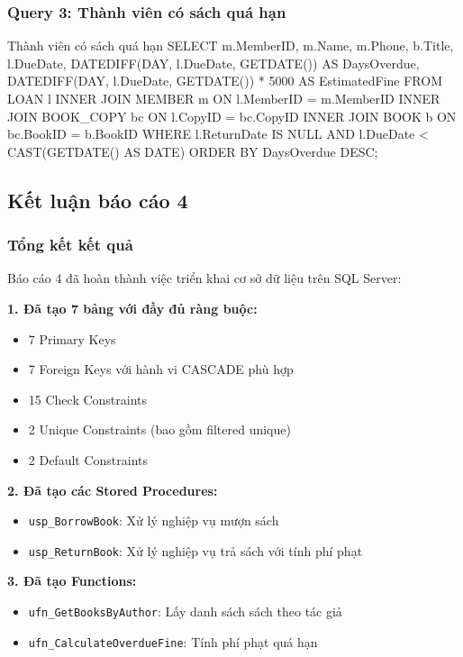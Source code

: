 \documentclass[12pt,a4paper]{article}
\begin{document}
\subsubsection{Query 3: Thành viên có sách quá hạn}

\begin{sqlcode}{Thành viên có sách quá hạn}
SELECT
    m.MemberID,
    m.Name,
    m.Phone,
    b.Title,
    l.DueDate,
    DATEDIFF(DAY, l.DueDate, GETDATE()) AS DaysOverdue,
    DATEDIFF(DAY, l.DueDate, GETDATE()) * 5000 AS EstimatedFine
FROM LOAN l
INNER JOIN MEMBER m ON l.MemberID = m.MemberID
INNER JOIN BOOK_COPY bc ON l.CopyID = bc.CopyID
INNER JOIN BOOK b ON bc.BookID = b.BookID
WHERE l.ReturnDate IS NULL
  AND l.DueDate < CAST(GETDATE() AS DATE)
ORDER BY DaysOverdue DESC;
\end{sqlcode}

\subsection{Kết luận báo cáo 4}

\subsubsection{Tổng kết kết quả}

Báo cáo 4 đã hoàn thành việc triển khai cơ sở dữ liệu trên SQL Server:

\textbf{1. Đã tạo 7 bảng với đầy đủ ràng buộc:}
\begin{itemize}
    \item 7 Primary Keys
    \item 7 Foreign Keys với hành vi CASCADE phù hợp
    \item 15 Check Constraints
    \item 2 Unique Constraints (bao gồm filtered unique)
    \item 2 Default Constraints
\end{itemize}

\textbf{2. Đã tạo các Stored Procedures:}
\begin{itemize}
    \item \texttt{usp\_BorrowBook}: Xử lý nghiệp vụ mượn sách
    \item \texttt{usp\_ReturnBook}: Xử lý nghiệp vụ trả sách với tính phí phạt
\end{itemize}

\textbf{3. Đã tạo Functions:}
\begin{itemize}
    \item \texttt{ufn\_GetBooksByAuthor}: Lấy danh sách sách theo tác giả
    \item \texttt{ufn\_CalculateOverdueFine}: Tính phí phạt quá hạn
\end{itemize}
\end{document}
